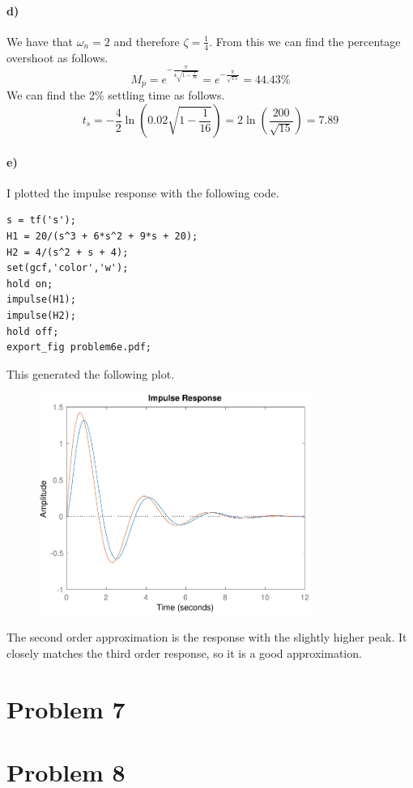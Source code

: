 \documentclass[12pt]{article}
\begin{document}
\paragraph{d)}

We have that \(\omega_n=2\) and therefore \(\zeta=\frac{1}{4}\). From this we can find the percentage overshoot as follows.
\[M_p=e^{-\frac{\pi}{4\sqrt{1-\frac{1}{16}}}}=e^{-\frac{\pi}{\sqrt{15}}}=44.43\%\]
We can find the 2\% settling time as follows.
\[t_s=-\frac{4}{2}\ln\left(0.02\sqrt{1-\frac{1}{16}}\right)=2\ln\left(\frac{200}{\sqrt{15}}\right)=7.89\]

\paragraph{e)}

I plotted the impulse response with the following code.
\begin{verbatim}
s = tf('s');
H1 = 20/(s^3 + 6*s^2 + 9*s + 20);
H2 = 4/(s^2 + s + 4);
set(gcf,'color','w');
hold on;
impulse(H1);
impulse(H2);
hold off;
export_fig problem6e.pdf;
\end{verbatim}
This generated the following plot.
\begin{figure}[H]
    \begin{center}
        \includegraphics[width=3.5in]{problem6e.pdf}
    \end{center}
\end{figure}
The second order approximation is the response with the slightly higher peak. It closely matches the third order response, so
it is a good approximation.

\section*{Problem 7}

\section*{Problem 8}
\end{document}
